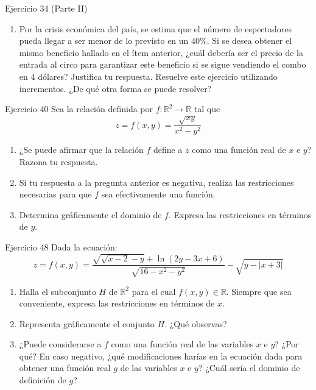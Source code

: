 \documentclass[aspectratio=169,10pt]{beamer}
\begin{document}
\begin{frame}{Ejercicio 34 (Parte II)}
  \small
  \begin{enumerate}
    \item[(C)] Por la crisis económica del país, se estima que el número de espectadores pueda llegar a ser menor de lo previsto en un $40\%$. Si se desea obtener el mismo beneficio hallado en el ítem anterior, ¿cuál debería ser el precio de la entrada al circo para garantizar este beneficio si se sigue vendiendo el combo en $4$ dólares? Justifica tu respuesta. Resuelve este ejercicio utilizando incrementos. ¿De qué otra forma se puede resolver?
  \end{enumerate}
  \vfill
\end{frame}

\begin{frame}{Ejercicio 40}
  \small
  Sea la relación definida por $f : \mathbb{R}^2 \longrightarrow \mathbb{R}$ tal que
  \[
    z = f(x,y) = \frac{\sqrt{xy}}{x^2 - y^2}
  \]
  \begin{enumerate}
    \item[(A)] ¿Se puede afirmar que la relación $f$ define a $z$ como una función real de $x$ e $y$? Razona tu respuesta.
    \item[(B)] Si tu respuesta a la pregunta anterior es negativa, realiza las restricciones necesarias para que $f$ sea efectivamente una función.
    \item[(C)] Determina gráficamente el dominio de $f$. Expresa las restricciones en términos de $y$.
  \end{enumerate}
  \vfill
\end{frame}

\begin{frame}{Ejercicio 48}
  \small
  Dada la ecuación:
  \[
    z = f(x,y) = \frac{\sqrt{\sqrt{x-2}-y} + \ln(2y - 3x + 6)}{\sqrt{16 - x^2 - y^2}} - \sqrt{y - |x+3|}
  \]
  \begin{enumerate}
    \item[(A)] Halla el subconjunto $H$ de $\mathbb{R}^2$ para el cual $f(x,y) \in \mathbb{R}$. Siempre que sea conveniente, expresa las restricciones en términos de $x$.
    \item[(B)] Representa gráficamente el conjunto $H$. ¿Qué observas?
    \item[(C)] ¿Puede considerarse a $f$ como una función real de las variables $x$ e $y$? ¿Por qué? En caso negativo, ¿qué modificaciones harías en la ecuación dada para obtener una función real $g$ de las variables $x$ e $y$? ¿Cuál sería el dominio de definición de $g$?
  \end{enumerate}
  \vfill
\end{frame}
\end{document}
